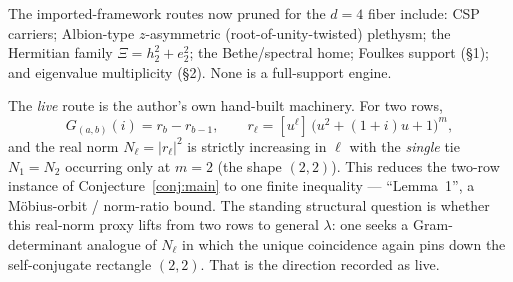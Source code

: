 \documentclass[11pt]{article}
\theoremstyle{definition}
\begin{document}
The imported-framework routes now pruned for the $d{=}4$ fiber include:
CSP carriers; Albion-type $z$-asymmetric (root-of-unity-twisted)
plethysm; the Hermitian family $\Xi=h_2^2+e_2^2$; the Bethe/spectral
home; Foulkes support (\S1); and eigenvalue multiplicity (\S2). None is a
full-support engine.

The \emph{live} route is the author's own hand-built machinery. For two
rows,
\[
  G_{(a,b)}(i)=r_b-r_{b-1},\qquad
  r_\ell=[u^\ell]\,\bigl(u^2+(1+i)u+1\bigr)^m ,
\]
and the real norm $N_\ell=|r_\ell|^2$ is strictly increasing in $\ell$
with the \emph{single} tie $N_1=N_2$ occurring only at $m=2$ (the shape
$(2,2)$). This reduces the two-row instance of
Conjecture~\ref{conj:main} to one finite inequality --- ``Lemma~1'', a
M\"obius-orbit / norm-ratio bound. The standing structural question is
whether this real-norm proxy lifts from two rows to general $\lambda$: one
seeks a Gram-determinant analogue of $N_\ell$ in which the unique
coincidence again pins down the self-conjugate rectangle $(2,2)$. That is
the direction recorded as live.
\end{document}

